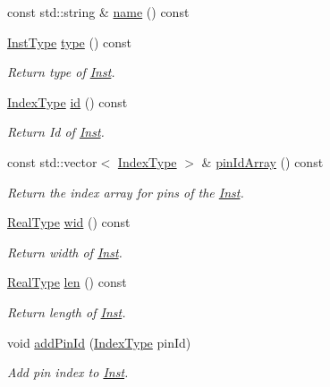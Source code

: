 \begin{DoxyCompactItemize}
const std\+::string \& \hyperlink{classInst_af2eca464fb81066a6f9878ae24a8292a}{name} () const
\item 
\hyperlink{type_8h_a53644c687d6bc203d9d3d3ee70075f61}{Inst\+Type} \hyperlink{classInst_a7d6e3dafcbb552bf31069d80b9b87607}{type} () const
\begin{DoxyCompactList}\small\item\em Return type of \hyperlink{classInst}{Inst}. \end{DoxyCompactList}\item 
\hyperlink{type_8h_a581e8093e28e7362f2b6937296190676}{Index\+Type} \hyperlink{classInst_a42b641ca923af69de223b8911cc2d45f}{id} () const
\begin{DoxyCompactList}\small\item\em Return Id of \hyperlink{classInst}{Inst}. \end{DoxyCompactList}\item 
const std\+::vector$<$ \hyperlink{type_8h_a581e8093e28e7362f2b6937296190676}{Index\+Type} $>$ \& \hyperlink{classInst_ab63305e9b98c220c6c09b8d69a8c8a71}{pin\+Id\+Array} () const
\begin{DoxyCompactList}\small\item\em Return the index array for pins of the \hyperlink{classInst}{Inst}. \end{DoxyCompactList}\item 
\hyperlink{type_8h_a51898ad9e46b1265f3fab67f7d4b04a2}{Real\+Type} \hyperlink{classInst_a18cd79f2cb3e30b1d8731381d311a919}{wid} () const
\begin{DoxyCompactList}\small\item\em Return width of \hyperlink{classInst}{Inst}. \end{DoxyCompactList}\item 
\hyperlink{type_8h_a51898ad9e46b1265f3fab67f7d4b04a2}{Real\+Type} \hyperlink{classInst_ab90470caf2f50b7127ee6946d93d449e}{len} () const
\begin{DoxyCompactList}\small\item\em Return length of \hyperlink{classInst}{Inst}. \end{DoxyCompactList}\item 
void \hyperlink{classInst_afee7f1349599a3514f0c6b0613ce9656}{add\+Pin\+Id} (\hyperlink{type_8h_a581e8093e28e7362f2b6937296190676}{Index\+Type} pin\+Id)
\begin{DoxyCompactList}\small\item\em Add pin index to \hyperlink{classInst}{Inst}. \end{DoxyCompactList}\item 

\end{DoxyCompactItemize}
